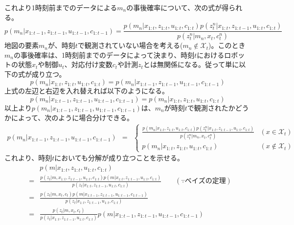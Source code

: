 \documentclass[dvipdfmx,a4paper]{jsarticle}
\begin{document}
これより1時刻前までのデータによる$m_n$の事後確率について、次の式が得られる。
\begin{equation}
	p(m_n | x_{1 : t - 1}, z_{1 : t - 1}, u_{1 : t - 1}, c_{1 : t - 1}) = \frac{p(m_n | x_{1 : t}, z_{1 : t}, u_{1 : t}, c_{1 : t}) p(z_t^n | x_{1 : t}, z_{1 : t - 1}, u_{1 : t}, c_{1 : t})}{p(z_t^n | m_n, x_t, c_t^n)}
\end{equation}
地図の要素$m_n$が、時刻$t$で観測されていない場合を考える($m_n \notin \mathcal{X}_t$)。このとき$m_n$の事後確率は、1時刻前までのデータによって決まり、時刻$t$におけるロボットの状態$x_t$や制御$u_t$、対応付け変数$c_t$や計測$z_t$とは無関係になる。従って単に以下の式が成り立つ。
\begin{equation}
	p(m_n | x_{1 : t}, z_{1 : t}, u_{1 : t}, c_{1 : t}) = p(m_n | x_{1 : t - 1}, z_{1 : t - 1}, u_{1 : t - 1}, c_{1 : t - 1})
\end{equation}
上式の左辺と右辺を入れ替えれば以下のようになる。
\begin{equation}
	p(m_n | x_{1 : t - 1}, z_{1 : t - 1}, u_{1 : t - 1}, c_{1 : t - 1}) = p(m_n | x_{1 : t}, z_{1 : t}, u_{1 : t}, c_{1 : t})
\end{equation}
以上より$p(m_n | x_{1 : t - 1}, z_{1 : t - 1}, u_{1 : t - 1}, c_{1 : t - 1})$は、$m_n$が時刻$t$で観測されたかどうかによって、次のように場合分けできる。
\begin{eqnarray}
	p(m_n | x_{1 : t - 1}, z_{1 : t - 1}, u_{1 : t - 1}, c_{1 : t - 1}) &=& \left\{ \begin{array}{ll} \displaystyle \frac{p(m_n | x_{1 : t}, z_{1 : t}, u_{1 : t}, c_{1 : t}) p(z_t^n | x_{1 : t}, z_{1 : t - 1}, u_{1 : t}, c_{1 : t})}{p(z_t^n | m_n, x_t, c_t^n)} & (x \in \mathcal{X}_t) \\ p(m_n | x_{1 : t}, z_{1 : t}, u_{1 : t}, c_{1 : t}) & (x \notin \mathcal{X}_t) \end{array} \right.
\end{eqnarray}
これより、時刻$t$においても分解が成り立つことを示せる。
\begin{eqnarray}
	&& p(m | x_{1 : t}, z_{1 : t}, u_{1 : t}, c_{1 : t}) \nonumber \\
	&=& \frac{p(z_t | m, x_{1 : t}, z_{1 : t - 1}, u_{1 : t}, c_{1 : t}) p(m | x_{1 : t}, z_{1 : t - 1}, u_{1 : t}, c_{1 : t})}{p(z_t | x_{1 : t}, z_{1 : t - 1}, u_{1 : t}, c_{1 : t})} \qquad (\because ベイズの定理) \nonumber \\
	&=& \frac{p(z_t | m, x_t, c_t) p(m | x_{1 : t - 1}, z_{1 : t - 1}, u_{1 : t - 1}, c_{1 : t - 1})}{p(z_t | x_{1 : t}, z_{1 : t - 1}, u_{1 : t}, c_{1 : t})} \nonumber \\
	&=& \frac{p(z_t | m, x_t, c_t)}{p(z_t | x_{1 : t}, z_{1 : t - 1}, u_{1 : t}, c_{1 : t})} p(m | x_{1 : t - 1}, z_{1 : t - 1}, u_{1 : t - 1}, c_{1 : t - 1})
\end{eqnarray}
\end{document}
